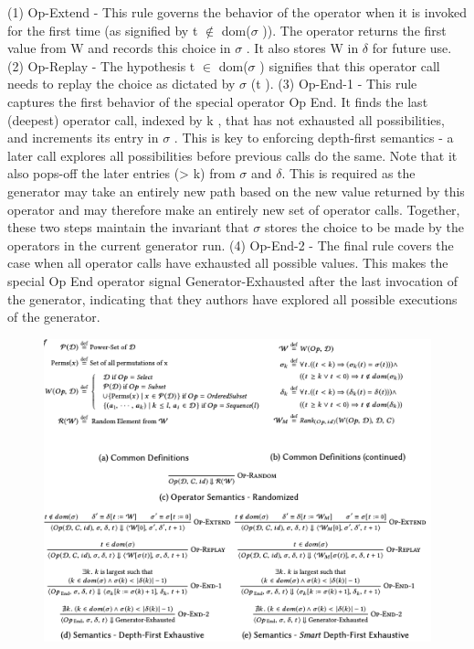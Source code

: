 \documentclass{article}
\begin{document}
(1) Op-Extend - This rule governs the behavior of the operator when it is invoked for the first time (as signified by t $\notin$ dom($\sigma$ )). The operator returns the first value from W and records this choice in $\sigma$  . It also stores W in  $\delta$ for future use.
(2) Op-Replay - The hypothesis t $\in$ dom($\sigma$  ) signifies that this operator call needs to replay the choice as dictated by $\sigma$ (t ).
(3) Op-End-1 - This rule captures the first behavior of the special operator Op End. It finds the last (deepest) operator call, indexed by k , that has not exhausted all possibilities, and increments its entry in $\sigma$  . This is key to enforcing depth-first semantics - a later call explores all possibilities before previous calls do the same. Note that it also pops-off the later entries (> k) from $\sigma$  and $\delta$. This is required as the generator may take an entirely new path based on the new value returned by this operator and may therefore make an entirely new set of operator calls. Together, these two steps maintain the invariant that $\sigma$  stores the choice to be made by the operators in the current generator run.
(4) Op-End-2 - The final rule covers the case when all operator calls have exhausted all possible values. This makes the special Op End operator signal Generator-Exhausted after the last invocation of the generator, indicating that they authors have explored all possible executions of the generator.

\begin{figure}[ht]
\vskip 0.2in
\begin{center}
\centerline{\includegraphics[width=\columnwidth]{Images/Synthesis3-2.png}}
\label{icml-historical}
\end{center}
\vskip -0.2in
\end{figure}
\end{document}
